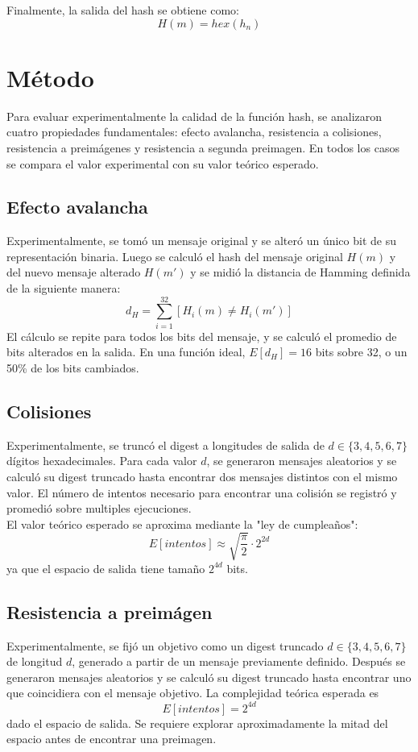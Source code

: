 \documentclass[11pt, letterpaper]{article}
\begin{document}
Finalmente, la salida del hash se obtiene como:
\begin{equation}
    H(m) = hex(h_n)
\end{equation}

\section{Método}
Para evaluar experimentalmente la calidad de la función hash, se analizaron cuatro propiedades fundamentales: efecto avalancha, resistencia a colisiones, resistencia a preimágenes y resistencia a segunda preimagen. En todos los casos se compara el valor experimental con su valor teórico esperado.

\subsection{Efecto avalancha}
Experimentalmente, se tomó un mensaje original y se alteró un único bit de su representación binaria. Luego se calculó el hash del mensaje original $H(m)$ y del nuevo mensaje alterado $H(m')$ y se midió la distancia de Hamming definida de la siguiente manera:
\begin{equation}
    d_H = \sum_{i=1}^{32}[H_i(m) \neq H_i(m')]
\end{equation}
El cálculo se repite para todos los bits del mensaje, y se calculó el promedio de bits alterados en la salida. En una función ideal, $E[d_H] = 16$ bits sobre 32, o un 50\% de los bits cambiados.
\subsection{Colisiones}
Experimentalmente, se truncó el digest a longitudes de salida de $d \in \{3, 4, 5, 6, 7\}$ dígitos hexadecimales. Para cada valor $d$, se generaron mensajes aleatorios y se calculó su digest truncado hasta encontrar dos mensajes distintos con el mismo valor. El número de intentos necesario para encontrar una colisión se registró y promedió sobre multiples ejecuciones.\\
El valor teórico esperado se aproxima mediante la "ley de cumpleaños":
\begin{equation}
    E[intentos] \approx \sqrt{\frac{\pi}{2}} \cdot 2^{2d}
\end{equation}
ya que el espacio de salida tiene tamaño $2^{4d}$ bits.
\subsection{Resistencia a preimágen}
Experimentalmente, se fijó un objetivo como un digest truncado $d \in \{3, 4, 5, 6, 7\}$ de longitud $d$, generado a partir de un mensaje previamente definido. Después se generaron mensajes aleatorios y se calculó su digest truncado hasta encontrar uno que coincidiera con el mensaje objetivo. La complejidad teórica esperada es
\begin{equation}
    E[intentos] = 2^{4d}
\end{equation}
dado el espacio de salida. Se requiere explorar aproximadamente la mitad del espacio antes de encontrar una preimagen.
\end{document}
